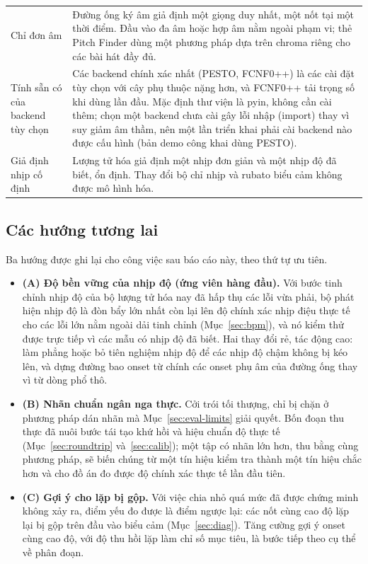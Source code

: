 \documentclass[12pt,a4paper]{article}
\begin{document}
\begin{longtable}{>{\raggedright\arraybackslash}p{} >{\raggedright\arraybackslash}p{}}
\addlinespace
Chỉ đơn âm & Đường ống ký âm giả định một giọng duy nhất, một nốt tại một thời điểm.
Đầu vào đa âm hoặc hợp âm nằm ngoài phạm vi; thẻ Pitch Finder dùng một phương pháp
dựa trên chroma riêng cho các bài hát đầy đủ. \\
\addlinespace
Tính sẵn có của backend tùy chọn & Các backend chính xác nhất (PESTO, FCNF0++) là
các cài đặt tùy chọn với cây phụ thuộc nặng hơn, và FCNF0++ tải trọng số khi dùng
lần đầu. Mặc định thư viện là pyin, không cần cài thêm; chọn một backend chưa cài
gây lỗi nhập (import) thay vì suy giảm âm thầm, nên một lần triển khai phải cài
backend nào được cấu hình (bản demo công khai dùng PESTO). \\
\addlinespace
Giả định nhịp cố định & Lượng tử hóa giả định một nhịp đơn giản và một nhịp độ đã
biết, ổn định. Thay đổi bộ chỉ nhịp và rubato biểu cảm không được mô hình hóa. \\
\end{longtable}

\subsection{Các hướng tương lai}
\label{sec:directions}

Ba hướng được ghi lại cho công việc sau báo cáo này, theo thứ tự ưu tiên.

\begin{itemize}
    \item \textbf{(A) Độ bền vững của nhịp độ (ứng viên hàng đầu).} Với bước tinh
    chỉnh nhịp độ của bộ lượng tử hóa nay đã hấp thụ các lỗi vừa phải, bộ phát hiện
    nhịp độ là đòn bẩy lớn nhất còn lại lên độ chính xác nhịp điệu thực tế cho các
    lỗi lớn nằm ngoài dải tinh chỉnh (Mục~\ref{sec:bpm}), và nó kiểm thử được trực
    tiếp vì các mẫu có nhịp độ đã biết. Hai thay đổi rẻ, tác động cao: làm phẳng
    hoặc bỏ tiên nghiệm nhịp độ để các nhịp độ chậm không bị kéo lên, và dựng đường
    bao onset từ chính các onset phụ âm của đường ống thay vì từ dòng phổ thô.
    \item \textbf{(B) Nhãn chuẩn ngân nga thực.} Cởi trói tối thượng, chỉ bị chặn ở
    phương pháp dán nhãn mà Mục~\ref{sec:eval-limits} giải quyết. Bốn đoạn thu thực
    đã nuôi bước tái tạo khứ hồi và hiệu chuẩn độ thực tế
    (Mục~\ref{sec:roundtrip} và~\ref{sec:calib}); một tập có nhãn lớn hơn, thu bằng
    cùng phương pháp, sẽ biến chúng từ một tín hiệu kiểm tra thành một tín hiệu chắc
    hơn và cho đồ án đo được độ chính xác thực tế lần đầu tiên.
    \item \textbf{(C) Gợi ý cho lặp bị gộp.} Với việc chia nhỏ quá mức đã được chứng
    minh không xảy ra, điểm yếu đo được là điểm ngược lại: các nốt cùng cao độ lặp
    lại bị gộp trên đầu vào biểu cảm (Mục~\ref{sec:diag}). Tăng cường gợi ý onset
    cùng cao độ, với độ thu hồi lặp làm chỉ số mục tiêu, là bước tiếp theo cụ thể về
    phân đoạn.
\end{itemize}
\end{document}
